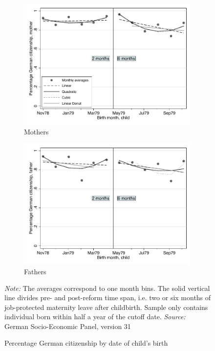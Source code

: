 \documentclass[a4paper ]{article}
\begin{document}
\begin{figure}[h]
	\centering
	\begin{subfigure}[h]{0.48\textwidth}
		\centering
		\includegraphics[width=0.99\textwidth]{../../analysis/graphs/SOEP/D_mcitizen_treated}
		\caption{Mothers}		
	\end{subfigure}
	\quad
	\begin{subfigure}[h]{0.48\textwidth}
		\centering
		\includegraphics[width=0.99\textwidth]{../../analysis/graphs/SOEP/D_fcitizen_treated}
		\caption{Fathers}
	\end{subfigure}
	\caption{Percentage German citizenship by date of child's birth}\label{fig:citizen_treatment cohort}
	\begin{minipage}{\textwidth} %
{\footnotesize \textit{Note:} The averages correspond to one month bins. The solid vertical line divides pre- and post-reform time span, i.e. two or six months of job-protected maternity leave after childbirth. Sample only contains individual born within half a year of the cutoff date. \newline \textit{Source: }German Socio-Economic Panel, version 31\par}
\end{minipage}
\end{figure}
\vspace*{\fill}
\end{document}
